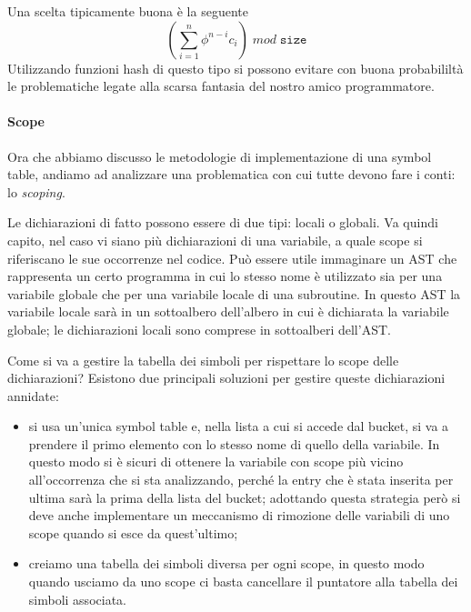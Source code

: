 \documentclass[class=book, crop=false, oneside, 12pt]{standalone}
\begin{document}
Una scelta tipicamente buona è la seguente
\begin{equation}
    (\sum_{i=1}^{n} \phi^{n-i}c_i) \; mod \; \texttt{size}
\end{equation}
Utilizzando funzioni hash di questo tipo si possono evitare con buona probabililtà le problematiche legate alla scarsa fantasia del nostro amico programmatore.

\paragraph{Scope} Ora che abbiamo discusso le metodologie di implementazione di una symbol table, andiamo ad analizzare una problematica con cui tutte devono fare i conti: lo \emph{scoping}.

Le dichiarazioni di fatto possono essere di due tipi: locali o globali.
Va quindi capito, nel caso vi siano più dichiarazioni di una variabile, a quale scope si riferiscano le sue occorrenze nel codice.
Può essere utile immaginare un AST che rappresenta un certo programma in cui lo stesso nome è utilizzato sia per una variabile globale che per una variabile locale di una subroutine.
In questo AST la variabile locale sarà in un sottoalbero dell'albero in cui è dichiarata la variabile globale; le dichiarazioni locali sono comprese in sottoalberi dell'AST.

Come si va a gestire la tabella dei simboli per rispettare lo scope delle dichiarazioni?
\noindent
Esistono due principali soluzioni per gestire queste dichiarazioni annidate:
\begin{itemize}
    \item si usa un'unica symbol table e, nella lista a cui si accede dal bucket, si va a prendere il primo elemento con lo stesso nome di quello della variabile. In questo modo si è sicuri di ottenere la variabile con scope più vicino all'occorrenza che si sta analizzando, perché la entry che è stata inserita per ultima sarà la prima della lista del bucket; adottando questa strategia però si deve anche implementare un meccanismo di rimozione delle variabili di uno scope quando si esce da quest'ultimo;
    \item creiamo una tabella dei simboli diversa per ogni scope, in questo modo quando usciamo da uno scope ci basta cancellare il puntatore alla tabella dei simboli associata.
\end{itemize}
\end{document}
